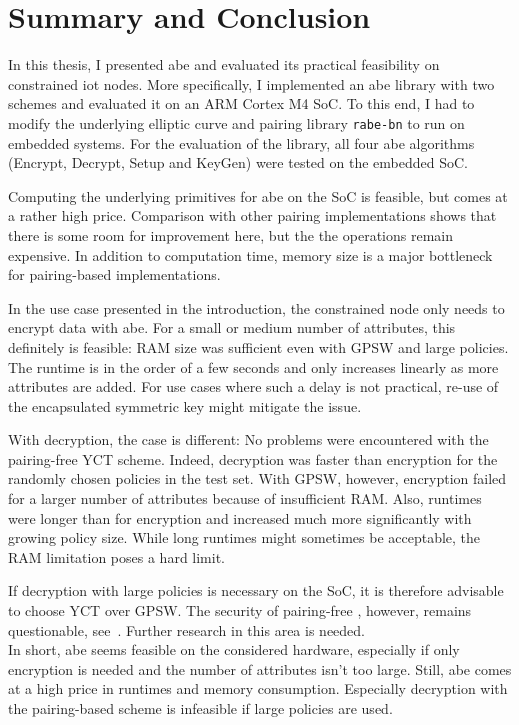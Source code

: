 \chapter{Summary and Conclusion}

In this thesis, I presented \acrshort{abe} and evaluated its practical feasibility on constrained \acrshort{iot} nodes.
More specifically, I implemented an \acrfull{abe} library with two schemes and evaluated it on an ARM Cortex M4 SoC.
To this end, I had to modify the underlying elliptic curve and pairing library \texttt{rabe-bn} to run on embedded systems.
For the evaluation of the library, all four \acrshort{abe} algorithms (Encrypt, Decrypt, Setup and KeyGen) were tested on the embedded SoC.

Computing the underlying primitives for \acrshort{abe} on the SoC is feasible, but comes at a rather high price.
Comparison with other pairing implementations shows that there is some room for improvement here, but the the operations remain expensive.
In addition to computation time, memory size is a major bottleneck for pairing-based implementations.

In the use case presented in the introduction, the constrained node only needs to encrypt data with \acrshort{abe}.
For a small or medium number of attributes, this definitely is feasible:
RAM size was sufficient even with GPSW and large policies.
The runtime is in the order of a few seconds and only increases linearly as more attributes are added.
For use cases where such a delay is not practical, re-use of the encapsulated symmetric key might mitigate the issue.

With decryption, the case is different: 
No problems were encountered with the pairing-free YCT scheme.
Indeed, decryption was faster than encryption for the randomly chosen policies in the test set.
With GPSW, however, encryption failed for a larger number of attributes because of insufficient RAM.
Also, runtimes were longer than for encryption and increased much more significantly with growing policy size.
While long runtimes might sometimes be acceptable, the RAM limitation poses a hard limit.

If decryption with large policies is necessary on the SoC, it is therefore advisable to choose YCT over GPSW.
The security of pairing-free , however, remains questionable, see~\cite{herranz_attacking_2020}.
Further research in this area is needed.\\

In short, \acrfull{abe} seems feasible on the considered hardware, especially if only encryption is needed and the number of attributes isn't too large.
Still, \acrshort{abe} comes at a high price in runtimes and memory consumption.
Especially decryption with the pairing-based scheme is infeasible if large policies are used.

